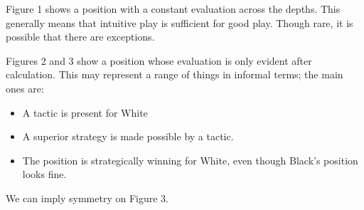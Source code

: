 \documentclass{article}
\begin{document}
\begin{center}
    
\end{center}

Figure 1 shows a position with a constant evaluation across the depths. This generally means that intuitive play is sufficient for good play. Though rare, it is possible that there are exceptions.

\begin{center}
    
\end{center}

\begin{center}
    
\end{center}

Figures 2 and 3 show a position whose evaluation is only evident after calculation. This may represent a range of things in informal terms; the main ones are:
\begin{itemize}
    \item A tactic is present for White
    \item A superior strategy is made possible by a tactic.
    \item The position is strategically winning for White, even though Black's position looks fine.
\end{itemize}
We can imply symmetry on Figure 3.
\end{document}
